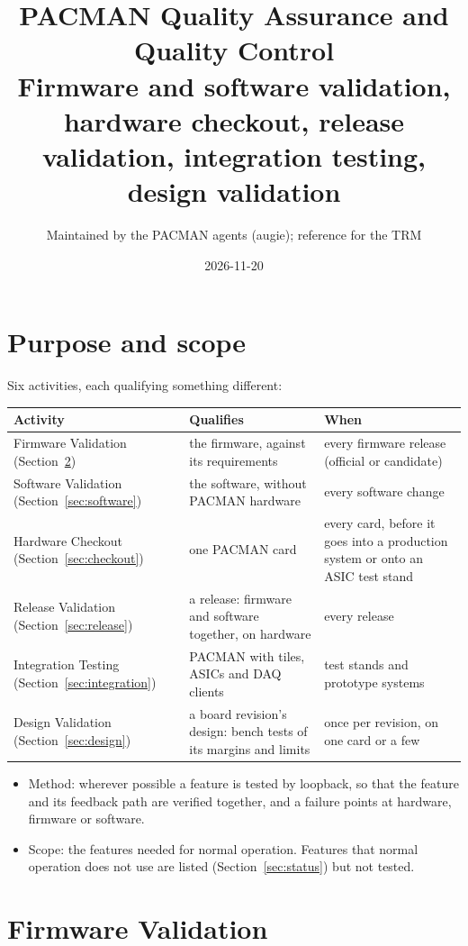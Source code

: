 \documentclass[11pt]{article}
\title{PACMAN Quality Assurance and Quality Control\\[2pt]
  \large Firmware and software validation, hardware checkout, release validation, integration testing,
  design validation}
\author{Maintained by the PACMAN agents (augie); reference for the TRM}
\date{2026-11-20}
\begin{document}
\maketitle
\sloppy

\section{Purpose and scope}

Six activities, each qualifying something different:

\begin{center}
\begin{tabularx}{\linewidth}{@{}lLL@{}}
\toprule
Activity & Qualifies & When \\
\midrule
Firmware Validation (Section~\ref{sec:firmware}) & the firmware, against its requirements & every firmware
  release (official or candidate) \\
Software Validation (Section~\ref{sec:software}) & the software, without PACMAN hardware & every software
  change \\
Hardware Checkout (Section~\ref{sec:checkout}) & one PACMAN card & every card, before it goes into a production
  system or onto an ASIC test stand \\
Release Validation (Section~\ref{sec:release}) & a release:  firmware and software together, on hardware & every
  release \\
Integration Testing (Section~\ref{sec:integration}) & PACMAN with tiles, ASICs and DAQ clients & test stands and
  prototype systems \\
Design Validation (Section~\ref{sec:design}) & a board revision's design:  bench tests of its margins and limits
  & once per revision, on one card or a few \\
\bottomrule
\end{tabularx}
\end{center}

\begin{itemize}
\item Method: wherever possible a feature is tested by loopback, so that the feature and its feedback path are
  verified together, and a failure points at hardware, firmware or software.
\item Scope: the features needed for normal operation.  Features that normal operation does not use are listed
  (Section~\ref{sec:status}) but not tested.
\end{itemize}

\section{Firmware Validation}\label{sec:firmware}
\end{document}
